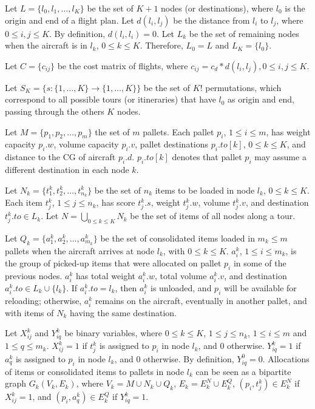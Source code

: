 \documentclass[preprint,authoryear]{elsarticle}
\begin{document}
Let $L = \{ l_0, l_1, \ldots, l_K \}$ be the set of $K+1$ nodes (or destinations), where $l_0$ is the origin and end of a flight plan. Let $d(l_i,l_j)$ be the distance from $l_i$ to $l_j$, where $0 \leq i,j \leq K$. By definition, $d(l_i,l_i)=0$. Let $L_k$ be the set of remaining nodes when the aircraft is in $l_k$, $0 \leq k \leq K$. Therefore, $L_0=L$ and $L_K = \{ l_0 \}$.

Let $C=\{c_{ij}\}$ be the cost matrix of flights, where $c_{ij} = c_d*d(l_i,l_j), 0 \leq i,j \leq K$.

Let $S_K = \{s: \{1, \dots, K\} \rightarrow \{1, \dots, K\} \}$ be the set of $K!$ permutations, which correspond to all possible tours (or itineraries) that have $l_0$ as origin and end, passing through the others $K$ nodes.

Let $M = \{p_1, p_2, \ldots, p_m \}$ the set of $m$ pallets. Each pallet $p_i$, $1 \leq i \leq m$, has weight capacity $p_i.w$, volume capacity $p_i.v$, pallet destinations $p_i.to[k]$, $0 \leq k \leq K$, and distance to the CG of aircraft $p_i.d$. $p_i.to[k]$ denotes that pallet $p_i$ may assume a different destination in each node $k$.

Let $N_k = \{t^k_1, t^k_2, \ldots, t^k_{n_k} \}$ be the set of $n_k$ items to be loaded in node $l_k$, $0 \leq k \leq K$. Each item $t^k_j$, $1 \leq j \leq n_k$, has score $t^k_j.s$, weight $t^k_j.w$, volume $t^k_j.v$, and destination $t^k_j.to \in L_k$. Let $N = \bigcup_{0 \leq k \leq K} N_k$ be the set of items of all nodes along a tour.

Let $Q_k = \{a^k_1, a^k_2, \ldots, a^k_{m_k} \}$ be the set of consolidated items loaded in $m_k \leq m$ pallets when the aircraft arrives at node $l_k$, with $0 \leq k \leq K$. $a^k_i$, $1 \leq i \leq m_k$, is the group of picked-up items that were allocated on pallet $p_i$ in some of the previous nodes. $a^k_i$ has total weight $a^k_i.w$, total volume $a^k_i.v$, and destination $a^k_i.to \in L_k \cup \{l_k\}$. If $a^k_i.to = l_k$, then $a^k_i$ is unloaded, and $p_i$ will be available for reloading; otherwise, $a^k_i$ remains on the aircraft, eventually in another pallet, and with items of $N_k$ having the same destination.

Let $X_{ij}^k$ and $Y_{iq}^k$ be binary variables, where $0 \leq k \leq K$, $1 \leq j \leq n_k$, $1 \leq i \leq m$ and $1 \leq q \leq m_k$. $X_{ij}^k = 1$ if $t_j^k$ is assigned to $p_i$ in node $l_k$, and 0 otherwise. $Y_{iq}^k = 1$ if $a_q^k$ is assigned to $p_i$ in node $l_k$, and 0 otherwise. By definition, $Y_{iq}^0=0$. Allocations of items or consolidated items to pallets in node $l_k$ can be seen as a bipartite graph $G_k(V_k, E_k)$, where $V_k = M \cup N_k \cup Q_k$, $E_k = E^N_k \cup E^Q_k$, $(p_i, t_j^k) \in E^N_k$ if $X_{ij}^k = 1$, and $(p_i, a_q^k) \in E^Q_k$ if $Y_{iq}^k = 1$.
\end{document}
